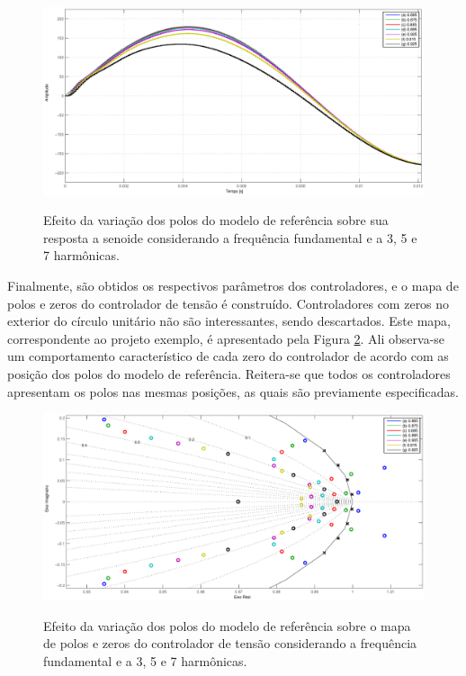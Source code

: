 \documentclass[repeatfields,oneside,overleaf]{tcc}
\begin{document}
\begin{figure}[h]
    \centering
    \caption{Efeito da variação dos polos do modelo de referência sobre sua resposta a senoide considerando a frequência fundamental e a 3{\textordfeminine}, 5{\textordfeminine} e 7{\textordfeminine} harmônicas.}
    \includegraphics[trim={80 25 80 43}, clip, width=0.78\linewidth]{fig/sinsim_M_7.eps}
    \\
    \label{fig:sinsim_M_7}
\end{figure}

Finalmente, são obtidos os respectivos parâmetros dos controladores, e o mapa de polos e zeros do controlador de tensão é construído.
Controladores com zeros no exterior do círculo unitário não são interessantes, sendo descartados.
Este mapa, correspondente ao projeto exemplo, é apresentado pela Figura \ref{fig:pz_C1_7}.
Ali observa-se um comportamento característico de cada zero do controlador de acordo com as posição dos polos do modelo de referência.
Reitera-se que todos os controladores apresentam os polos nas mesmas posições, as quais são previamente especificadas.

\begin{figure}[h]
    \centering
    \caption{Efeito da variação dos polos do modelo de referência sobre o mapa de polos e zeros do controlador de tensão considerando a frequência fundamental e a 3{\textordfeminine}, 5{\textordfeminine} e 7{\textordfeminine} harmônicas.}
    \includegraphics[trim={80 25 80 43}, clip, width=0.78\linewidth]{fig/pz_C1_7.eps}
    \\
    \label{fig:pz_C1_7}
\end{figure}
\end{document}
